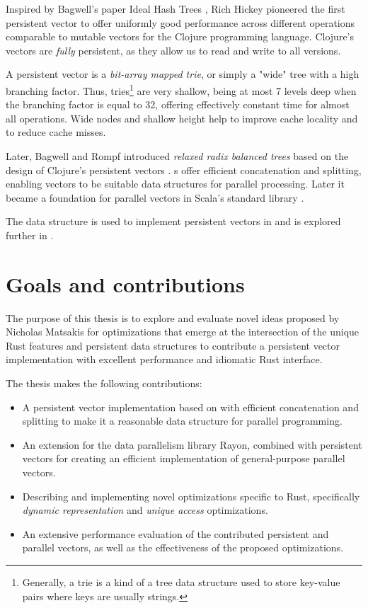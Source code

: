 Inspired by Bagwell's paper Ideal Hash Trees \cite{ideal-hash-trees}, Rich Hickey pioneered the first persistent vector to offer uniformly good performance across different operations comparable to mutable vectors for the Clojure programming language. Clojure's vectors are \emph{fully} persistent, as they allow us to read and write to all versions.

A persistent vector is a \emph{bit-array mapped trie}, or simply a "wide" tree with a high branching factor. Thus, tries\footnote{Generally, a trie is a kind of a tree data structure used to store key-value pairs where keys are usually strings.} are very shallow, being at most 7 levels deep when the branching factor is equal to 32, offering effectively constant time for almost all operations. Wide nodes and shallow height help to improve cache locality and to reduce cache misses.

Later, Bagwell and Rompf introduced \emph{relaxed radix balanced trees} based on the design of Clojure's persistent vectors \cite{efficient-immutable-vectors}. \treerrb{}s offer efficient concatenation and splitting, enabling vectors to be suitable data structures for parallel processing. Later it became a foundation for parallel vectors in Scala's standard library \cite{rrb-vector-practical-general-purpose-im-sequence}.

The \treerrb{} data structure is used to implement persistent vectors in \pvecrs{} and is explored further in .

\section{Goals and contributions}
\label{sec:contributions}
The purpose of this thesis is to explore and evaluate novel ideas proposed by Nicholas Matsakis for optimizations that emerge at the intersection of the unique Rust features and persistent data structures to contribute a persistent vector implementation with excellent performance and idiomatic Rust interface.

The thesis makes the following contributions:
\begin{itemize}
    \item A persistent vector implementation based on \treerrb{} with efficient concatenation and splitting to make it a reasonable data structure for parallel programming.
    \item An extension for the data parallelism library Rayon, combined with persistent vectors for creating an efficient implementation of general-purpose parallel vectors.
    \item Describing and implementing novel optimizations specific to Rust, specifically \emph{dynamic representation} and \emph{unique access} optimizations.
    \item An extensive performance evaluation of the contributed persistent and parallel vectors, as well as the effectiveness of the proposed optimizations.
\end{itemize}

